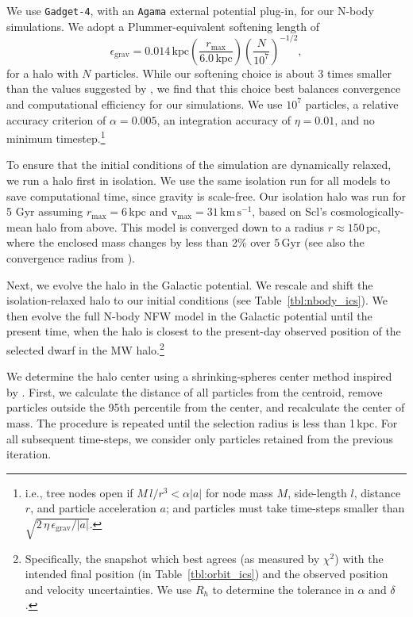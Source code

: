 \documentclass[linenumbers, twocolumn, twocolappendix]{aastex701}
\newcommand{\V}{\textrm{v}}
\newcommand{\vmax}{\V_\text{max}}
\newcommand{\rmax}{r_\text{max}}
\newcommand{\kpc}{\text{kpc}}
\newcommand{\Gyr}{\text{Gyr}}
\newcommand{\kms}{\mathrm{km\,s^{-1}}}
\newcommand{\agama}{\texttt{Agama}}
\newcommand{\gadget}{\texttt{Gadget-4}}
\begin{document}
We use \gadget{}, with an \agama{} external potential plug-in, for our N-body simulations. 
We adopt a Plummer-equivalent softening length of
\begin{equation}\label{eq:softening_length}
    \epsilon_\text{grav} = 0.014\,\text{kpc}\left(\frac{r_\text{max}}{6.0\,\text{kpc}}\right)\left(\frac{N}{10^7}\right)^{-1/2},
\end{equation} 
for a halo with $N$ particles. While our softening choice is about 3 times smaller than the values suggested by \citet{power+2003}, we find that this choice best balances convergence and computational efficiency for our simulations.
We use $10^7$ particles, a relative accuracy criterion of $\alpha=0.005$, an integration accuracy of $\eta=0.01$, and no minimum timestep.\footnote{i.e., tree nodes open if $M\,l/r^3 < \alpha |a|$ for node mass $M$, side-length $l$, distance $r$, and particle acceleration $a$; and particles must take time-steps smaller than $\sqrt{2\,\eta\,\epsilon_\text{grav} / |a|}$.}

To ensure that the initial conditions of the simulation are dynamically
relaxed, we run a halo first in isolation. We use the same isolation run for all models to save computational time, since gravity is scale-free. Our isolation halo was run for 5 Gyr assuming $\rmax=6\,\kpc$ and $\vmax=31\,\kms$, based on Scl's cosmologically-mean halo from above.
This model is converged down to a radius $r\approx 150\,\text{pc}$, where the enclosed mass changes by less than 2\% over $5\,\Gyr$ (see also the convergence radius from \citealt{power+2003}).

Next, we evolve the halo in the Galactic potential. We rescale and shift the
isolation-relaxed halo to our initial conditions (see Table~\ref{tbl:nbody_ics}). 
We then evolve the full N-body NFW model in the Galactic
potential until the present time, when the halo is closest to the present-day observed position of the selected dwarf in the MW
halo.\footnote{Specifically, the snapshot which best agrees (as measured
  by $\chi^2$) with the intended final position (in
  Table~\ref{tbl:orbit_ics}) and the observed position and velocity
  uncertainties. We use $R_h$ to determine the tolerance in $\alpha$ and
  $\delta$.}


We determine the halo center using a shrinking-spheres center method inspired by \citet{power+2003}.
First, we calculate the distance of all particles from the centroid, remove particles outside
the 95th percentile from the center, and recalculate the center of mass.
The procedure is repeated until the selection radius is less than
1\,kpc. 
For all subsequent time-steps, we
consider only particles retained from the previous iteration. 
\end{document}
